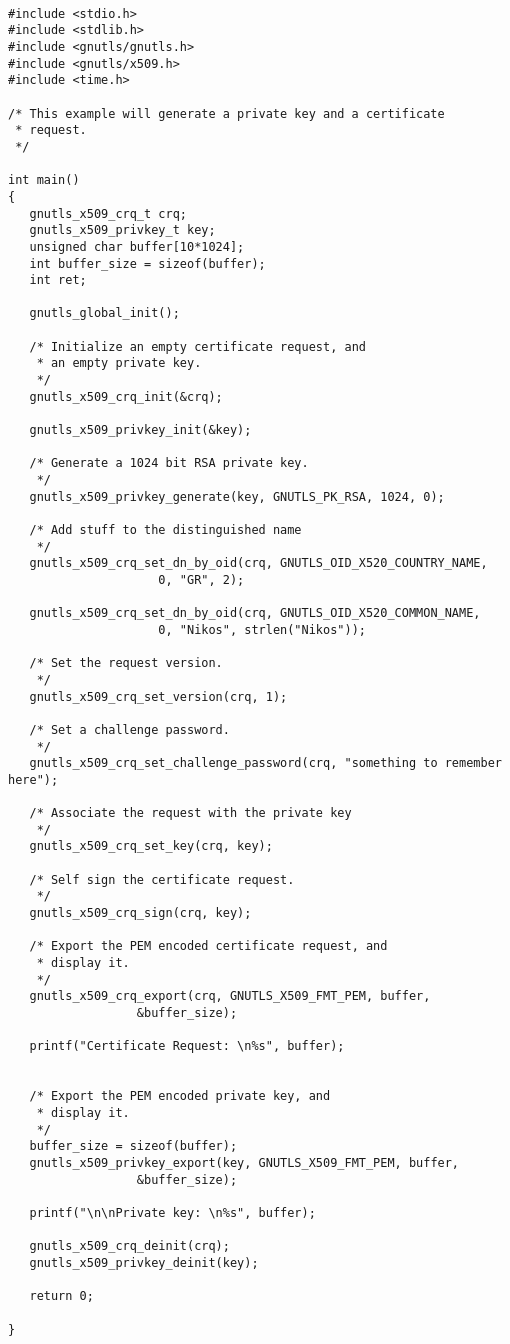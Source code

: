 \begin{verbatim}

#include <stdio.h>
#include <stdlib.h>
#include <gnutls/gnutls.h>
#include <gnutls/x509.h>
#include <time.h>

/* This example will generate a private key and a certificate
 * request.
 */

int main()
{
   gnutls_x509_crq_t crq;
   gnutls_x509_privkey_t key;
   unsigned char buffer[10*1024];
   int buffer_size = sizeof(buffer);
   int ret;

   gnutls_global_init();

   /* Initialize an empty certificate request, and
    * an empty private key.
    */
   gnutls_x509_crq_init(&crq);

   gnutls_x509_privkey_init(&key);

   /* Generate a 1024 bit RSA private key.
    */
   gnutls_x509_privkey_generate(key, GNUTLS_PK_RSA, 1024, 0);

   /* Add stuff to the distinguished name
    */
   gnutls_x509_crq_set_dn_by_oid(crq, GNUTLS_OID_X520_COUNTRY_NAME,
				     0, "GR", 2);

   gnutls_x509_crq_set_dn_by_oid(crq, GNUTLS_OID_X520_COMMON_NAME,
				     0, "Nikos", strlen("Nikos"));

   /* Set the request version.
    */
   gnutls_x509_crq_set_version(crq, 1);

   /* Set a challenge password.
    */
   gnutls_x509_crq_set_challenge_password(crq, "something to remember here");

   /* Associate the request with the private key
    */
   gnutls_x509_crq_set_key(crq, key);

   /* Self sign the certificate request.
    */
   gnutls_x509_crq_sign(crq, key);

   /* Export the PEM encoded certificate request, and
    * display it.
    */
   gnutls_x509_crq_export(crq, GNUTLS_X509_FMT_PEM, buffer,
			      &buffer_size);

   printf("Certificate Request: \n%s", buffer);


   /* Export the PEM encoded private key, and
    * display it.
    */
   buffer_size = sizeof(buffer);
   gnutls_x509_privkey_export(key, GNUTLS_X509_FMT_PEM, buffer,
				  &buffer_size);

   printf("\n\nPrivate key: \n%s", buffer);

   gnutls_x509_crq_deinit(crq);
   gnutls_x509_privkey_deinit(key);

   return 0;

}

\end{verbatim}
